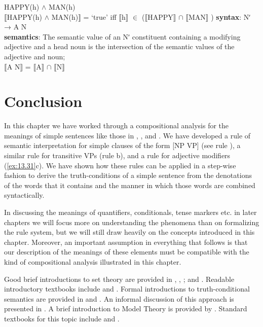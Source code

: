 \ea \label{ex:13.31}
\ea  HAPPY(h) $\wedge$ MAN(h)\\
\ex  $\llbracket$HAPPY(h) $\wedge$ MAN(h)$\rrbracket$  = ‘true’  iff  $\llbracket$h$\rrbracket$  ${\in}$ ($\llbracket$HAPPY$\rrbracket$  ${\cap}$ $\llbracket$MAN$\rrbracket$ )
\ex  \textbf{syntax}: Nʹ  →  A N\\
\textbf{semantics}: The semantic value of an Nʹ constituent containing a modifying adjective and a head noun is the intersection of the semantic values of the adjective and noun;\\
{}$\llbracket$A N$\rrbracket$  =  $\llbracket$A$\rrbracket$  ${\cap}$ $\llbracket$N$\rrbracket$ 
\z \z

\section{Conclusion}\label{sec:13.6}

In this chapter we have worked through a compositional analysis for the meanings of simple sentences like those in , , and . We have developed a rule of semantic interpretation for simple clauses of the form [NP VP] (see rule ), a similar rule for transitive VPs (rule b), and a rule for adjective modifiers (\ref{ex:13.31}c). We have shown how these rules can be applied in a step-wise fashion to derive the truth-conditions of a simple sentence from the denotations of the words that it contains and the manner in which those words are combined syntactically.



In discussing the meanings of quantifiers, conditionals, tense markers etc. in later chapters we will focus more on understanding the phenomena than on formalizing the rule system, but we will still draw heavily on the concepts introduced in this chapter. Moreover, an important assumption in everything that follows is that our description of the meanings of these elements must be compatible with the kind of compositional analysis illustrated in this chapter.



\furtherreading



Good brief introductions to set theory are provided in \citet[ch. 2]{AllwoodEtAl1977},
\citet[ch. 2]{Martin1987},
\citet[ch. 2]{Coppock2016}; and 
\citet[ch. 5]{McCawley1981a}. Readable introductory textbooks include \citet{Halmos1960} and \citet{Enderton1977}. Formal introductions to truth-conditional semantics are provided in  \citet{DowtyEtAl1981} and \citet{HeimKratzer1998}. An informal discussion of this approach is presented in \citet{Bach1989}. A brief introduction to Model Theory is provided by \citet{Hodges2013}. Standard textbooks for this topic include \citet{ChangKeisler1990} and \citet{Hodges1997}.


